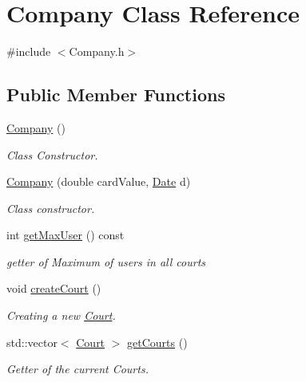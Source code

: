 \hypertarget{class_company}{}\section{Company Class Reference}
\label{class_company}


{\ttfamily \#include $<$Company.\+h$>$}

\subsection*{Public Member Functions}
\begin{DoxyCompactItemize}
\item 
\mbox{\label{class_company_a29937dda711b09df306ae7ca9b3d6b42}} 
\mbox{\hyperlink{class_company_a29937dda711b09df306ae7ca9b3d6b42}{Company}} ()
\begin{DoxyCompactList}\small\item\em Class Constructor. \end{DoxyCompactList}\item 
\mbox{\hyperlink{class_company_ac038a4c5e02f13a7bab9b5139990316e}{Company}} (double card\+Value, \mbox{\hyperlink{class_date}{Date}} d)
\begin{DoxyCompactList}\small\item\em Class constructor. \end{DoxyCompactList}\item 
int \mbox{\hyperlink{class_company_a837fd39a8f03c20a3ceb8617410956b7}{get\+Max\+User}} () const
\begin{DoxyCompactList}\small\item\em getter of Maximum of users in all courts \end{DoxyCompactList}\item 
\mbox{\label{class_company_a10770d690a59f9b4d9f84de6d0f527c9}} 
void \mbox{\hyperlink{class_company_a10770d690a59f9b4d9f84de6d0f527c9}{create\+Court}} ()
\begin{DoxyCompactList}\small\item\em Creating a new \mbox{\hyperlink{class_court}{Court}}. \end{DoxyCompactList}\item 
std\+::vector$<$ \mbox{\hyperlink{class_court}{Court}} $>$ \mbox{\hyperlink{class_company_afa0ab125a0ba718fe2c13802fe1703be}{get\+Courts}} ()
\begin{DoxyCompactList}\small\item\em Getter of the current Courts. \end{DoxyCompactList}\item 

\end{DoxyCompactItemize}
